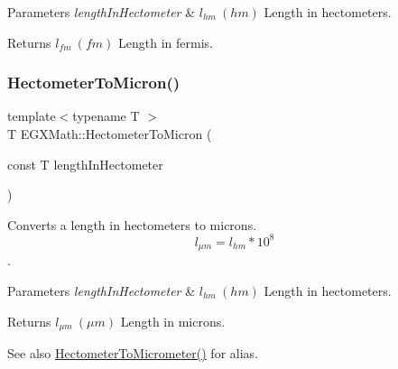 \begin{DoxyParams}{Parameters}
{\em length\+In\+Hectometer} & $ l_{hm}\ (hm)$ Length in hectometers. \\
\hline
\end{DoxyParams}
\begin{DoxyReturn}{Returns}
$ l_{fm}\ (fm)$ Length in fermis. 
\end{DoxyReturn}
\mbox{\label{group___e_g_x_math-_conversions-_length_conversions-_s_i-_hectometer-_non-_s_i_ga997feaaeb91fc61c1d87c5d77fb7a665}} 
\subsubsection{\texorpdfstring{Hectometer\+To\+Micron()}{HectometerToMicron()}}
{\footnotesize\ttfamily template$<$typename T $>$ \\
T E\+G\+X\+Math\+::\+Hectometer\+To\+Micron (\begin{DoxyParamCaption}\item[{const T}]{length\+In\+Hectometer }\end{DoxyParamCaption})}



Converts a length in hectometers to microns. \[ l_{\mu m}=l_{hm} * 10^{8} \]. 


\begin{DoxyParams}{Parameters}
{\em length\+In\+Hectometer} & $ l_{hm}\ (hm)$ Length in hectometers. \\
\hline
\end{DoxyParams}
\begin{DoxyReturn}{Returns}
$ l_{\mu m}\ (\mu m)$ Length in microns. 
\end{DoxyReturn}
\begin{DoxySeeAlso}{See also}
\mbox{\hyperlink{group___e_g_x_math-_conversions-_length_conversions-_s_i-_hectometer-_s_i_ga3f5229b11d79e20007ac9320a317272a}{Hectometer\+To\+Micrometer()}} for alias. 
\end{DoxySeeAlso}
\mbox{\label{group___e_g_x_math-_conversions-_length_conversions-_s_i-_hectometer-_non-_s_i_gac2840604040746ae9a4c51fd1bb3e6f6}} 
